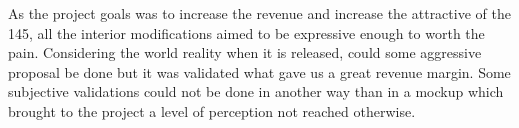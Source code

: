 ﻿As the project goals was to increase the revenue and increase the attractive of the 145, all the interior modifications aimed to be expressive enough to worth the pain. Considering the world reality when it is released, could some aggressive proposal be done but it was validated what gave us a great revenue margin. Some subjective validations could not be done in another way than in a mockup which brought to the project a level of perception not reached otherwise.